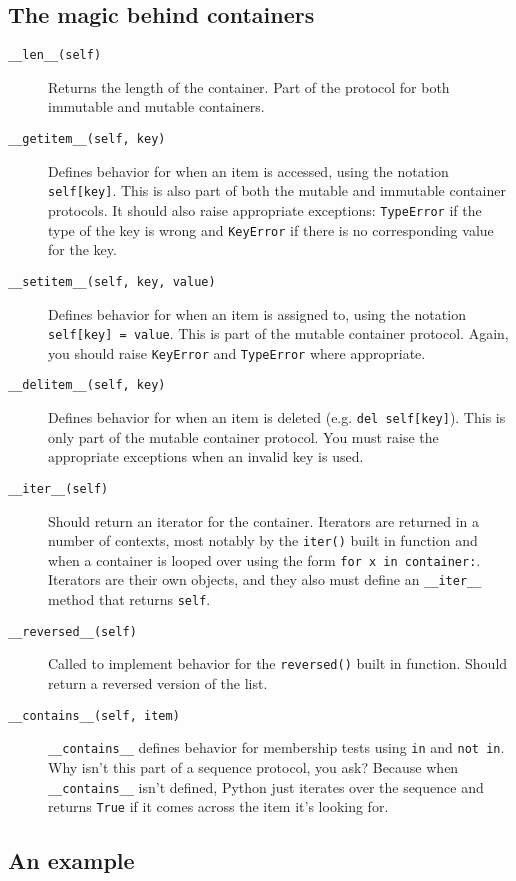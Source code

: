 \documentclass[a4paper,11pt]{article}
\newcommand{\code}[1]{\texttt{#1}}
\begin{document}
\subsection{The magic behind containers}
\begin{description}

\item[\code{__len__(self)}]
Returns the length of the container. Part of the protocol for both immutable and mutable containers.
\item[\code{__getitem__(self, key)}]
Defines behavior for when an item is accessed, using the notation \code{self[key]}. This is also part of both the mutable and immutable container protocols. It should also raise appropriate exceptions: \code{TypeError} if the type of the key is wrong and \code{KeyError} if there is no corresponding value for the key.
\item[\code{__setitem__(self, key, value)}]
Defines behavior for when an item is assigned to, using the notation \code{self[key] = value}. This is part of the mutable container protocol. Again, you should raise \code{KeyError} and \code{TypeError} where appropriate.
\item[\code{__delitem__(self, key)}]
Defines behavior for when an item is deleted (e.g. \code{del self[key]}). This is only part of the mutable container protocol. You must raise the appropriate exceptions when an invalid key is used.
\item[\code{__iter__(self)}]
Should return an iterator for the container. Iterators are returned in a number of contexts, most notably by the \code{iter()} built in function and when a container is looped over using the form \code{for x in container:}. Iterators are their own objects, and they also must define an \code{__iter__} method that returns \code{self}.
\item[\code{__reversed__(self)}]
Called to implement behavior for the \code{reversed()} built in function. Should return a reversed version of the list.
\item[\code{__contains__(self, item)}]
\code{__contains__} defines behavior for membership tests using \code{in} and \code{not in}. Why isn't this part of a sequence protocol, you ask? Because when \code{__contains__} isn't defined, Python just iterates over the sequence and returns \code{True} if it comes across the item it's looking for.

\end{description}

\subsection{An example}
\end{document}
